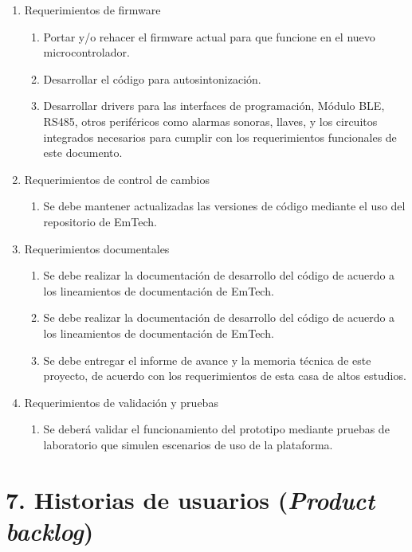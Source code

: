 \documentclass[
11pt, %
]{charter}
\begin{document}
\begin{enumerate}
\begin{enumerate}
		\end{enumerate}
	\item Requerimientos de firmware
	\begin{enumerate}
			\item Portar y/o rehacer el firmware actual para que funcione en el nuevo microcontrolador. 
			\item Desarrollar el código para autosintonización.
			\item Desarrollar drivers para las interfaces de programación, Módulo BLE, RS485, otros periféricos como alarmas sonoras, llaves, y los circuitos integrados necesarios para cumplir con los requerimientos funcionales de este documento.
			\end{enumerate}
	\item Requerimientos de control de cambios
	\begin{enumerate}
			\item Se debe mantener actualizadas las versiones de código mediante el uso del repositorio de EmTech.
			\end{enumerate}
	
	\item Requerimientos documentales
	\begin{enumerate}
			\item Se debe realizar la documentación de desarrollo del código de acuerdo a los lineamientos de documentación de EmTech. 
			\item Se debe realizar la documentación de desarrollo del código de acuerdo a los lineamientos de documentación de EmTech.
			\item Se debe entregar el informe de avance y la memoria técnica de este proyecto, de acuerdo con los requerimientos de esta casa de altos estudios.
			\end{enumerate}
			\item Requerimientos de validación y pruebas
	\begin{enumerate}
			\item Se deberá validar el funcionamiento del prototipo mediante pruebas de laboratorio que simulen escenarios de uso de la plataforma.
			\end{enumerate}
\end{enumerate}



\section{7. Historias de usuarios (\textit{Product backlog})}
\label{sec:backlog}
\end{document}
